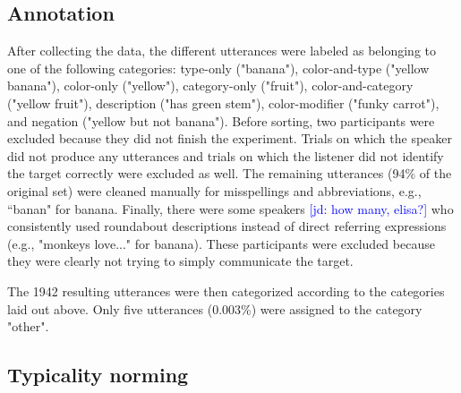 \documentclass[10pt,letterpaper]{article}
\newcommand{\jd}[1]{\textcolor{Blue}{[jd: #1]}}
\begin{document}
\subsection{Annotation}
After collecting the data, the different utterances were labeled as belonging to one of the following categories: type-only ("banana"), color-and-type ("yellow banana"),  color-only ("yellow"), category-only ("fruit"), color-and-category ("yellow fruit"), description ("has green stem"), color-modifier ("funky carrot"), and negation ("yellow but not banana"). Before sorting, two participants were excluded because they did not finish the experiment. Trials on which the speaker did not produce any utterances and trials on which the listener did not identify the target correctly were excluded as well. The remaining utterances (94\% of the original set) were cleaned manually for misspellings and abbreviations, e.g., ``banan" for banana. Finally, there were some speakers \jd{how many, elisa?} who consistently used roundabout descriptions instead of direct referring expressions (e.g., "monkeys love..." for banana). These participants were excluded because they were clearly not trying to simply communicate the target.

The 1942 resulting utterances were then categorized according to the categories laid out above. Only five utterances (0.003\%) were assigned to the category "other".




\subsection{Typicality norming}
\end{document}
